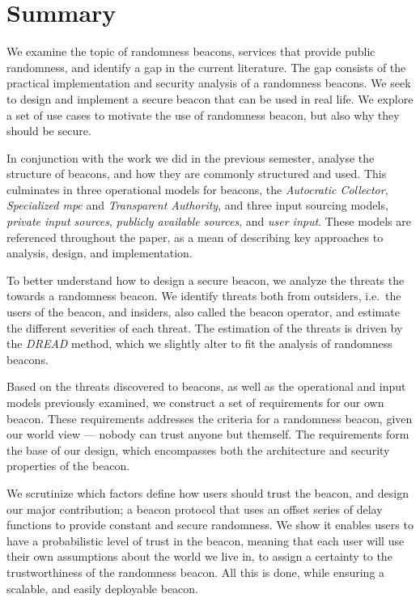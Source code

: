 \section*{Summary}
We examine the topic of randomness beacons, services that provide public randomness, and identify a gap in the current literature.
The gap consists of the practical implementation and security analysis of a randomness beacons.
We seek to design and implement a secure beacon that can be used in real life.
We explore a set of use cases to motivate the use of randomness beacon, but also why they should be secure.

In conjunction with the work we did in the previous semester, analyse the structure of beacons, and how they are commonly structured and used.
This culminates in three operational models for beacons, the \emph{Autocratic Collector}, \emph{Specialized \acrshort{mpc}} and \emph{Transparent Authority}, and three input sourcing models, \emph{private input sources}, \emph{publicly available sources}, and \emph{user input}.
These models are referenced throughout the paper, as a mean of describing key approaches to analysis, design, and implementation.

\bigskip\noindent
To better understand how to design a secure beacon, we analyze the threats the towards a randomness beacon.
We identify threats both from outsiders, i.e.\ the users of the beacon, and insiders, also called the beacon operator, and estimate the different severities of each threat.
The estimation of the threats is driven by the \emph{DREAD} method, which we slightly alter to fit the analysis of randomness beacons.

Based on the threats discovered to beacons, as well as the operational and input models previously examined, we construct a set of requirements for our own beacon.
These requirements addresses the criteria for a randomness beacon, given our world view --- nobody can trust anyone but themself.
The requirements form the base of our design, which encompasses both the architecture and security properties of the beacon.

\bigskip\noindent
We scrutinize which factors define how users should trust the beacon, and design our major contribution; a beacon protocol that uses an offset series of delay functions to provide constant and secure randomness.
We show it enables users to have a probabilistic level of trust in the beacon, meaning that each user will use their own assumptions about the world we live in, to assign a certainty to the trustworthiness of the randomness beacon.
All this is done, while ensuring a scalable, and easily deployable beacon.

